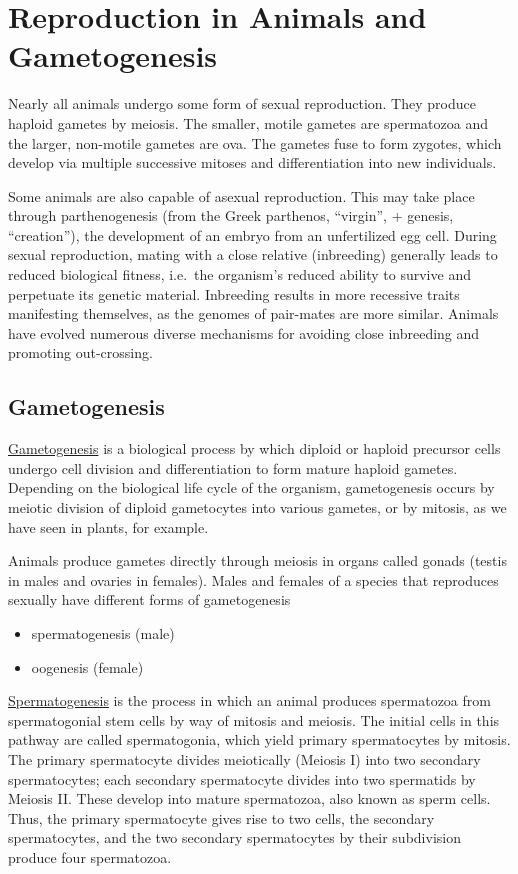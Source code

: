 \chapter{Reproduction in Animals and
Gametogenesis}\label{reproduction-in-animals-and-gametogenesis}

Nearly all animals undergo some form of sexual reproduction. They
produce haploid gametes by meiosis. The smaller, motile gametes are
spermatozoa and the larger, non-motile gametes are ova. The gametes fuse
to form zygotes, which develop via multiple successive mitoses and
differentiation into new individuals.

Some animals are also capable of asexual reproduction. This may take
place through parthenogenesis (from the Greek parthenos, ``virgin'', +
genesis, ``creation''), the development of an embryo from an
unfertilized egg cell. During sexual reproduction, mating with a close
relative (inbreeding) generally leads to reduced biological fitness,
i.e.~the organism's reduced ability to survive and perpetuate its
genetic material. Inbreeding results in more recessive traits
manifesting themselves, as the genomes of pair-mates are more similar.
Animals have evolved numerous diverse mechanisms for avoiding close
inbreeding and promoting out-crossing.

\section{Gametogenesis}\label{gametogenesis}

\href{https://en.wikipedia.org/wiki/Gametogenesis}{Gametogenesis} is a
biological process by which diploid or haploid precursor cells undergo
cell division and differentiation to form mature haploid gametes.
Depending on the biological life cycle of the organism, gametogenesis
occurs by meiotic division of diploid gametocytes into various gametes,
or by mitosis, as we have seen in plants, for example.

Animals produce gametes directly through meiosis in organs called gonads
(testis in males and ovaries in females). Males and females of a species
that reproduces sexually have different forms of gametogenesis

\begin{itemize}
  \tightlist
  \item
  spermatogenesis (male)
  \item
  oogenesis (female)
\end{itemize}

\href{https://en.wikipedia.org/wiki/Spermatogenesis}{Spermatogenesis} is
the process in which an animal produces spermatozoa from spermatogonial
stem cells by way of mitosis and meiosis. The initial cells in this
pathway are called spermatogonia, which yield primary spermatocytes by
mitosis. The primary spermatocyte divides meiotically (Meiosis I) into
two secondary spermatocytes; each secondary spermatocyte divides into
two spermatids by Meiosis II. These develop into mature spermatozoa,
also known as sperm cells. Thus, the primary spermatocyte gives rise to
two cells, the secondary spermatocytes, and the two secondary
spermatocytes by their subdivision produce four spermatozoa.

